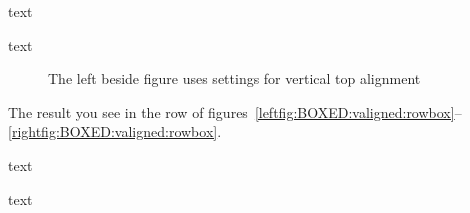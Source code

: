 \documentclass{book}
\def\text{{\mdseries And more text and some more text and a bit more text and
a little more text and a little peace of text to fill space}}
\def\Text{text%
}
\begin{document}
\Text

\Text
\clearpage

   \begin{figure*}[H]
   {\caption{The left beside figure uses settings for vertical top alignment}%
    \label{leftfig:BOXED:valigned:besoutrowbox}}%
   \end{figure*}%
   The result you see in the row of
   figures~\ref{leftfig:BOXED:valigned:rowbox}--\ref{rightfig:BOXED:valigned:rowbox}.

\Text

\Text
\clearpage

\makeatletter
%


%
\end{document}
